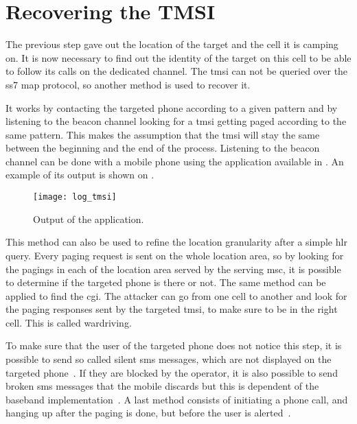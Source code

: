     \section{Recovering the TMSI}
    \label{sec:recovering_tmsi}
      
      The previous step gave out the location of the target and the cell
      it is camping on. It is now necessary to find out the identity of
      the target on this cell to be able to follow its calls on the
      dedicated channel. The \gls{tmsi} can not be queried over the
      \gls{ss7} \gls{map} protocol, so another method is used to recover
      it.
      
      It works by contacting the targeted phone according to a given
      pattern and by listening to the beacon channel looking for a
      \gls{tmsi} getting paged according to the same pattern. This makes
      the assumption that the \gls{tmsi} will stay the same between the
      beginning and the end of the process. Listening to the beacon
      channel can be done with a mobile phone using the
       application available in . An
      example of its output is shown on .

      \begin{figure}[h]
        \centering
        \texttt{[image: log\_tmsi]}
      \caption{Output of the  application.}
        \label{fig:log_tmsi}
      \end{figure}

      This method can also be used to refine the location granularity
      after a simple \gls{hlr} query. Every paging request is sent on
      the whole location area, so by looking for the pagings in each of
      the location area served by the serving \gls{msc}, it is possible
      to determine if the targeted phone is there or not. The same
      method can be applied to find the \gls{cgi}. The attacker can go
      from one cell to another and look for the paging responses sent by
      the targeted \gls{tmsi}, to make sure to be in the right cell.
      This is called wardriving.

      To make sure that the user of the targeted phone does not notice
      this step, it is possible to send so called silent \gls{sms}
      messages, which are not displayed on the targeted
      phone~\cite[p.~53]{3gpp_ts_2001}. If they are blocked by the
      operator, it is also possible to send broken \gls{sms} messages
      that the mobile discards but this is dependent of the baseband
      implementation~\cite{golde_sms-o-death:_2011}. A last method
      consists of initiating a phone call, and hanging up after the
      paging is done, but before the user is
      alerted~\cite{kune_location_2012}.

